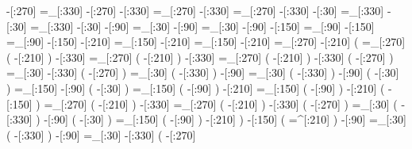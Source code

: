      -[:270]%
    =_[:330]%
     -[:270]%
     -[:330]%
    =_[:270]%
     -[:330]%
    =_[:270]%
     -[:330]%
      -[:30]%
    =_[:330]%
      -[:30]%
    =_[:330]%
      -[:30]%
      -[:90]%
     =_[:30]%
      -[:90]%
     =_[:30]%
      -[:90]%
     -[:150]%
     =_[:90]%
     -[:150]%
     =_[:90]%
     -[:150]%
     -[:210]%
    =_[:150]%
     -[:210]%
    =_[:150]%
     -[:210]%
    =_[:270]%
     -[:210]%
               (
        =_[:270]%
                   (
             -[:210]%
                   )
         -[:330]%
        =_[:270]%
                   (
             -[:210]%
                   )
         -[:330]%
        =_[:270]%
                   (
             -[:210]%
                   )
         -[:330]%
                   (
             -[:270]%
                   )
         =_[:30]%
         -[:330]%
                   (
             -[:270]%
                   )
         =_[:30]%
                   (
             -[:330]%
                   )
          -[:90]%
         =_[:30]%
                   (
             -[:330]%
                   )
          -[:90]%
                   (
              -[:30]%
                   )
        =_[:150]%
          -[:90]%
                   (
              -[:30]%
                   )
        =_[:150]%
                   (
              -[:90]%
                   )
         -[:210]%
        =_[:150]%
                   (
              -[:90]%
                   )
         -[:210]%
                   (
             -[:150]%
                   )
        =_[:270]%
                   (
             -[:210]%
                   )
         -[:330]%
        =_[:270]%
                   (
             -[:210]%
                   )
         -[:330]%
                   (
             -[:270]%
                   )
         =_[:30]%
                   (
             -[:330]%
                   )
          -[:90]%
                   (
              -[:30]%
                   )
        =_[:150]%
                   (
              -[:90]%
                   )
         -[:210]%
               )
     -[:150]%
               (
        =^[:210]%
               )
      -[:90]%
     =_[:30]%
               (
         -[:330]%
               )
      -[:90]%
     =_[:30]%
     -[:330]%
               (
         -[:270]%

